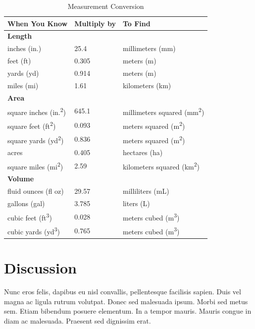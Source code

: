 \documentclass[12pt,letterpaper]{article}
\begin{document}
\begin{table}[h]
  \caption{Measurement Conversion}
  \label{tab:1}
  \centering
  \begin{tabular}{lll}
    \toprule
    \textbf{When You Know} & \textbf{Multiply by} & \textbf{To Find} \\
    \midrule
    \textbf{Length} & & \\
    inches (in.)            & 25.4  & millimeters (mm) \\
    feet (ft)               & 0.305 & meters (m) \\
    yards (yd)              & 0.914 & meters (m) \\
    miles (mi)              & 1.61  & kilometers (km) \\
    \addlinespace
    \textbf{Area} & & \\
    square inches (in.\textsuperscript{2}) & 645.1 & millimeters squared (mm\textsuperscript{2}) \\
    square feet (ft\textsuperscript{2})    & 0.093 & meters squared (m\textsuperscript{2}) \\
    square yards (yd\textsuperscript{2})   & 0.836 & meters squared (m\textsuperscript{2}) \\
    acres                                  & 0.405 & hectares (ha) \\
    square miles (mi\textsuperscript{2})   & 2.59  & kilometers squared (km\textsuperscript{2}) \\
    \addlinespace
    \textbf{Volume} & & \\
    fluid ounces (fl oz)              & 29.57 & milliliters (mL) \\
    gallons (gal)                     & 3.785 & liters (L) \\
    cubic feet (ft\textsuperscript{3})  & 0.028 & meters cubed (m\textsuperscript{3}) \\
    cubic yards (yd\textsuperscript{3}) & 0.765 & meters cubed (m\textsuperscript{3}) \\
    \bottomrule
  \end{tabular}
\end{table}

\section{Discussion}
Nunc eros felis, dapibus eu nisl convallis, pellentesque facilisis sapien. Duis vel
magna ac ligula rutrum volutpat. Donec sed malesuada ipsum. Morbi sed metus sem. Etiam
bibendum posuere elementum. In a tempor mauris. Mauris congue in diam ac malesuada.
Praesent sed dignissim erat.
\end{document}
